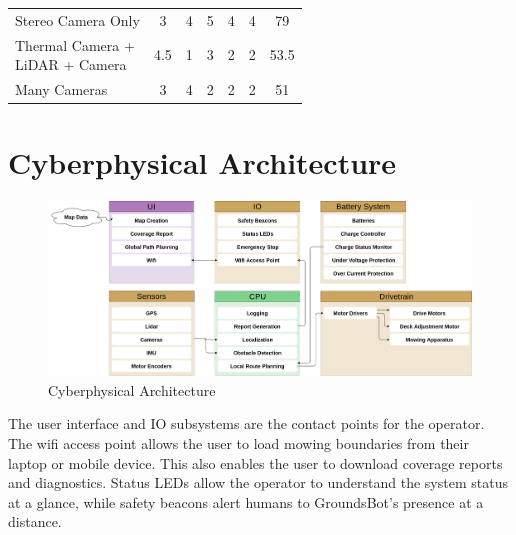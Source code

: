\documentclass[12pt]{extarticle}
\begin{document}
\begin{table}[H]
\begin{adjustwidth}{0in}{0in}
\begin{tabular}{lcccccc}
		\multicolumn{1}{l}{\cellcolor{highlight}Stereo Camera Only}& \multicolumn{1}{c}{\cellcolor{highlight}3} & \multicolumn{1}{c}{\cellcolor{highlight}4} & \multicolumn{1}{c}{\cellcolor{highlight}5} & \multicolumn{1}{c}{\cellcolor{highlight}4} & \multicolumn{1}{c}{\cellcolor{highlight}4} & \multicolumn{1}{c}{\cellcolor{highlight}79}    \\ \hdashline
		\makecell[l]{Thermal Camera + \\ LiDAR + Camera}             & 4.5     & 1    & 3                               & 2                               & 2                       & 53.5  \\ \hdashline
		Many Cameras                                                 & 3       & 4    & 2                               & 2                               & 2                       & 51    \\ 
		
		\end{tabular}

		\end{adjustwidth}
		\end{table}


\newpage
\section{Cyberphysical Architecture}
\begin{figure}[H]
\includegraphics[scale=0.2]{cyberphysical.png}
\caption{Cyberphysical Architecture}
\label{fig:cyberphysical}
\end{figure}

  The user interface and IO subsystems are the contact points for the operator.  The wifi access point allows the user to load mowing boundaries from their laptop or mobile device.  This also enables the user to download coverage reports and diagnostics.  Status LEDs allow the operator to understand the system status at a glance, while safety beacons alert humans to GroundsBot's presence at a distance.\\
\end{document}
